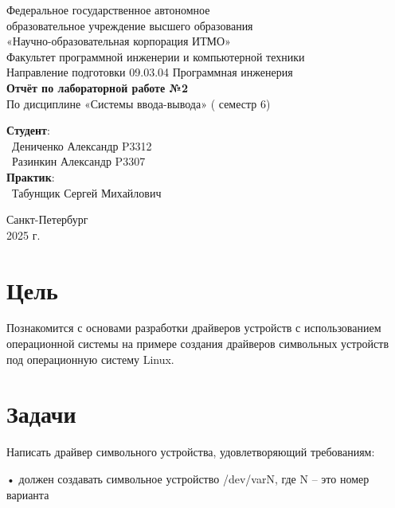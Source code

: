 \documentclass{article}
\begin{document}
\begin{center}
    \Large
    Федеральное государственное автономное \\
    образовательное учреждение высшего образования \\ 
    «Научно-образовательная корпорация ИТМО»\\
    \vspace{0.5cm}
    \large
    Факультет программной инженерии и компьютерной техники \\
    Направление подготовки 09.03.04 Программная инженерия \\
    \vspace{1cm}
    \Large
    \textbf{Отчёт по лабораторной работе №2} \\
        По дисциплине «Системы ввода-вывода» ( семестр 6)\\
    \large
    \vspace{8cm}

    \begin{minipage}{.33\textwidth}
    \end{minipage}
    \hfill
    \begin{minipage}{.4\textwidth}
    
        \textbf{Студент}: \vspace{.1cm} \\
        \ Дениченко Александр P3312\\
        \ Разинкин Александр P3307\\
        \textbf{Практик}:  \\
        \ Табунщик Сергей Михайлович
    \end{minipage}
    \vfill
Санкт-Петербург\\ 2025 г.
\end{center}
\pagestyle{empty}
\newpage
\pagestyle{plain}

\section*{Цель}
Познакомится с основами разработки драйверов устройств с
использованием операционной системы на примере создания
драйверов символьных устройств под операционную систему Linux.
\section{Задачи}
Написать драйвер символьного устройства, удовлетворяющий
требованиям:

• должен создавать символьное устройство /dev/varN, где N – это
номер варианта
\end{document}
